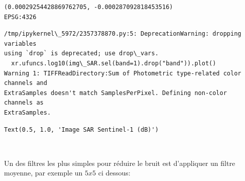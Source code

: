 \documentclass[11pt]{article}
\makeatletter
\newcommand{\boxspacing}{\kern\kvtcb@left@rule\kern\kvtcb@boxsep}
\newcommand{\prompt}[4]{
        {\ttfamily\llap{{\color{#2}[#3]:\hspace{3pt}#4}}\vspace{-\baselineskip}}
    }
\makeatother
\begin{document}
    \begin{Verbatim}[commandchars=\\\{\}]
(0.00029254428869762705, -0.000287092818453516)
EPSG:4326
    \end{Verbatim}

    \begin{Verbatim}[commandchars=\\\{\}]
/tmp/ipykernel\_5972/2357378870.py:5: DeprecationWarning: dropping variables
using `drop` is deprecated; use drop\_vars.
  xr.ufuncs.log10(img\_SAR.sel(band=1).drop("band")).plot()
Warning 1: TIFFReadDirectory:Sum of Photometric type-related color channels and
ExtraSamples doesn't match SamplesPerPixel. Defining non-color channels as
ExtraSamples.
    \end{Verbatim}

            \begin{tcolorbox}[breakable, size=fbox, boxrule=.5pt, pad at break*=1mm, opacityfill=0]
\prompt{Out}{outcolor}{15}{\boxspacing}
\begin{Verbatim}[commandchars=\\\{\}]
Text(0.5, 1.0, 'Image SAR Sentinel-1 (dB)')
\end{Verbatim}
\end{tcolorbox}
        
    \begin{center}
    \end{center}
    { \hspace*{\fill} \\}
    
    Un des filtres les plus simples pour réduire le bruit est d'appliquer un
filtre moyenne, par exemple un \(5x5\) ci dessous:
\end{document}
